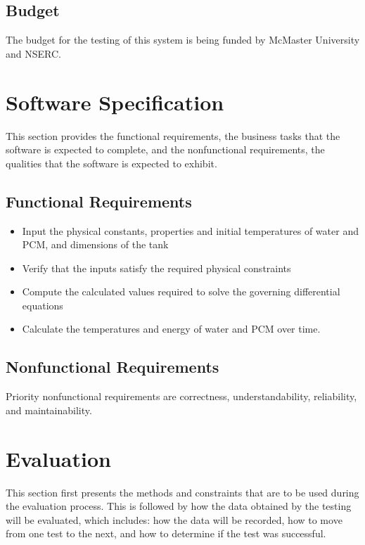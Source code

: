 \documentclass[12pt]{article}
\begin{document}
\subsection{Budget}
The budget for the testing of this system is being funded by McMaster University and NSERC.

%
%

\section{ Software Specification}
This section provides the functional requirements, the business tasks that the
software is expected to complete, and the nonfunctional requirements, the
qualities that the software is expected to exhibit.

\subsection{Functional Requirements}

\noindent
\begin{itemize}
\item Input the physical constants, properties and initial temperatures of water
 and PCM, and dimensions of the tank  
\item Verify that the inputs satisfy the required physical constraints 
\item Compute the calculated values required to solve the governing differential equations
\item Calculate the temperatures and energy of water and PCM over time.
\end{itemize} 

\subsection{Nonfunctional Requirements}
Priority nonfunctional requirements are correctness, understandability,
reliability, and maintainability.


%
%

\section{Evaluation}
This section first presents the methods and constraints that are to be used
during the evaluation process. This is followed by how the data obtained by the
testing will be evaluated, which includes: how the data will be recorded, how to
move from one test to the next, and how to determine if the test was successful.
\end{document}
